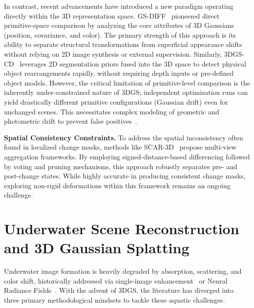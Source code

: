 In contrast, recent advancements have introduced a new paradigm operating directly within the 3D representation space. GS-DIFF~\cite{galappaththige2026pixelsprimitivesscenechange} pioneered direct primitive-space comparison by analyzing the core attributes of 3D Gaussians (position, covariance, and color). The primary strength of this approach is its ability to separate structural transformations from superficial appearance shifts without relying on 2D image synthesis or external supervision. Similarly, 3DGS-CD~\cite{10852207} leverages 2D segmentation priors fused into the 3D space to detect physical object rearrangements rapidly, without requiring depth inputs or pre-defined object models. However, the critical limitation of primitive-level comparison is the inherently under-constrained nature of 3DGS; independent optimization runs can yield drastically different primitive configurations (Gaussian drift) even for unchanged scenes. This necessitates complex modeling of geometric and photometric drift to prevent false positives~\cite{galappaththige2026pixelsprimitivesscenechange}.

\textbf{Spatial Consistency Constraints.}
To address the spatial inconsistency often found in localized change masks, methods like SCAR-3D~\cite{zhou20253dscenechangemodeling} propose multi-view aggregation frameworks. By employing signed-distance-based differencing followed by voting and pruning mechanisms, this approach robustly separates pre- and post-change states. While highly accurate in producing consistent change masks, exploring non-rigid deformations within this framework remains an ongoing challenge.

\section{Underwater Scene Reconstruction and 3D Gaussian Splatting}

Underwater image formation is heavily degraded by absorption, scattering, and color shift, historically addressed via single-image enhancement~\cite{s20185170} or Neural Radiance Fields~\cite{10203316}. With the advent of 3DGS, the literature has diverged into three primary methodological mindsets to tackle these aquatic challenges.

